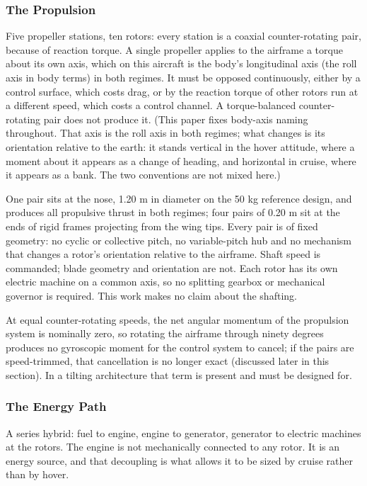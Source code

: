 \documentclass[journal]{new-aiaa}
\begin{document}
\subsubsection{The Propulsion}

Five propeller stations, ten rotors: every station is a coaxial counter-rotating pair, because of reaction torque. A single propeller applies to the airframe a torque about its own axis, which on this aircraft is the body's longitudinal axis (the roll axis in body terms) in both regimes. It must be opposed continuously, either by a control surface, which costs drag, or by the reaction torque of other rotors run at a different speed, which costs a control channel. A torque-balanced counter-rotating pair does not produce it. (This paper fixes body-axis naming throughout. That axis is the roll axis in both regimes; what changes is its orientation relative to the earth: it stands vertical in the hover attitude, where a moment about it appears as a change of heading, and horizontal in cruise, where it appears as a bank. The two conventions are not mixed here.)

One pair sits at the nose, 1.20 m in diameter on the 50 kg reference design, and produces all propulsive thrust in both regimes; four pairs of 0.20 m sit at the ends of rigid frames projecting from the wing tips. Every pair is of fixed geometry: no cyclic or collective pitch, no variable-pitch hub and no mechanism that changes a rotor's orientation relative to the airframe. Shaft speed is commanded; blade geometry and orientation are not. Each rotor has its own electric machine on a common axis, so no splitting gearbox or mechanical governor is required. This work makes no claim about the shafting.

At equal counter-rotating speeds, the net angular momentum of the propulsion system is nominally zero, so rotating the airframe through ninety degrees produces no gyroscopic moment for the control system to cancel; if the pairs are speed-trimmed, that cancellation is no longer exact (discussed later in this section). In a tilting architecture that term is present and must be designed for.

\subsubsection{The Energy Path}

A series hybrid: fuel to engine, engine to generator, generator to electric machines at the rotors. The engine is not mechanically connected to any rotor. It is an energy source, and that decoupling is what allows it to be sized by cruise rather than by hover.
\end{document}
